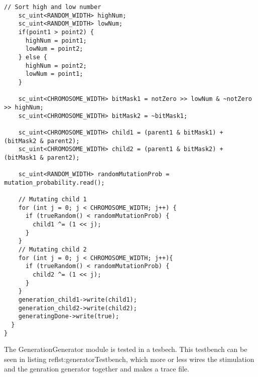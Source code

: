 \begin{lstlisting}[style=customc++,caption={GenerationGenerator.cpp},label={lst:generationgenerator_cpp}]
    // Sort high and low number
    sc_uint<RANDOM_WIDTH> highNum;
    sc_uint<RANDOM_WIDTH> lowNum;
    if(point1 > point2) {
      highNum = point1;
      lowNum = point2;
    } else {
      highNum = point2;
      lowNum = point1;
    }
  
    sc_uint<CHROMOSOME_WIDTH> bitMask1 = notZero >> lowNum & ~notZero >> highNum;
    sc_uint<CHROMOSOME_WIDTH> bitMask2 = ~bitMask1;

    sc_uint<CHROMOSOME_WIDTH> child1 = (parent1 & bitMask1) + (bitMask2 & parent2);
    sc_uint<CHROMOSOME_WIDTH> child2 = (parent1 & bitMask2) + (bitMask1 & parent2);

    sc_uint<RANDOM_WIDTH> randomMutationProb = mutation_probability.read();

    // Mutating child 1
    for (int j = 0; j < CHROMOSOME_WIDTH; j++) {
      if (trueRandom() < randomMutationProb) {
        child1 ^= (1 << j);
      }
    }
    // Mutating child 2
    for (int j = 0; j < CHROMOSOME_WIDTH; j++){
      if (trueRandom() < randomMutationProb) {
        child2 ^= (1 << j);
      }
    }
    generation_child1->write(child1);
    generation_child2->write(child2);
    generatingDone->write(true);
  }
}
\end{lstlisting}

The GenerationGenerator module is tested in a tesbech. This testbench can be seen in listing ref{lst:generatorTestbench}, which more or less wires the stimulation and the genration generator together and makes a trace file.

